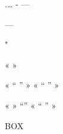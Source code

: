 
.…
-
 — 

—

"

« »

 «  “ ” »
 «  “ ” »


« »
“”
 «  “ ” »

\tiny{}
\scriptsize{}
{\footnotesize}
\normalsize{}
\large{}
\Large{}
\LARGE{}
\huge{}
\Huge{}
BOX

\begin{center}
\setlength{\fboxsep}{3mm}
\fbox{
}
\end{center}

